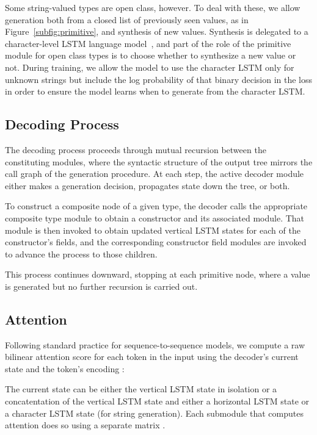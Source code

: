 \documentclass[11pt,a4paper]{article}
\begin{document}
Some string-valued types are open class, however. To deal with these, we allow generation both from a closed list of previously seen values, as in Figure~\ref{subfig:primitive}, and synthesis of new values. Synthesis is delegated to a character-level LSTM language model~\citep{Bengio03Neural}, and part of the role of the primitive module for open class types is to choose whether to synthesize a new value or not. During training, we allow the model to use the character LSTM only for unknown strings but include the log probability of that binary decision in the loss in order to ensure the model learns when to generate from the character LSTM. 

\subsection{Decoding Process}\label{subsec:decoding-process}



The decoding process proceeds through mutual recursion between the constituting modules, where the syntactic structure of the output tree mirrors the call graph of the generation procedure. At each step, the active decoder module either makes a generation decision, propagates state down the tree, or both. 

To construct a composite node of a given type, the decoder calls the appropriate composite type module to obtain a constructor and its associated module. That module is then invoked to obtain updated vertical LSTM states for each of the constructor's fields, and the corresponding constructor field modules are invoked to advance the process to those children.

This process continues downward, stopping at each primitive node, where a value is
generated but no further recursion is carried out.









\subsection{Attention}\label{subsec:attention}

Following standard practice for sequence-to-sequence models, we compute a raw bilinear attention score  for each token  in the input using the decoder's current state  and the token's encoding :

The current state  can be either the vertical LSTM state in isolation or a concatentation of the vertical LSTM state and either a horizontal LSTM state or a character LSTM state (for string generation). Each submodule that computes attention does so using a separate matrix .
\end{document}
